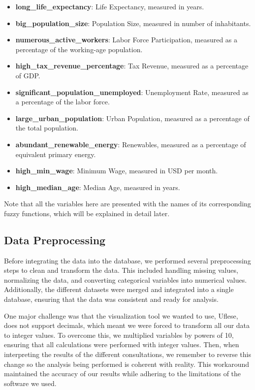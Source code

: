 \documentclass[fleqn,11pt]{article}
\begin{document}
\begin{itemize}
    \item \textbf{long\_life\_expectancy}: Life Expectancy, measured in years.
    \item \textbf{big\_population\_size}: Population Size, measured in number of inhabitants.
    \item \textbf{numerous\_active\_workers}: Labor Force Participation, measured as a percentage of the working-age population.
    \item \textbf{high\_tax\_revenue\_percentage}: Tax Revenue, measured as a percentage of GDP.
    \item \textbf{significant\_population\_unemployed}: Unemployment Rate, measured as a percentage of the labor force.
    \item \textbf{large\_urban\_population}: Urban Population, measured as a percentage of the total population.
    \item \textbf{abundant\_renewable\_energy}: Renewables, measured as a percentage of equivalent primary energy.
    \item \textbf{high\_min\_wage}: Minimum Wage, measured in USD per month.
    \item \textbf{high\_median\_age}: Median Age, measured in years.
\end{itemize}
Note that all the variables here are presented with the names of its corresponding fuzzy functions, which will be explained in detail later.

\subsection{Data Preprocessing}

Before integrating the data into the database, we performed several preprocessing steps to clean and transform the data.
This included handling missing values, normalizing the data, and converting categorical variables into numerical values.
Additionally, the different datasets were merged and integrated into a single database, ensuring that the data was consistent and ready for analysis.

One major challenge was that the visualization tool we wanted to use, Uflese, does not support decimals, which meant we were forced to transform all our data to integer values. To overcome this, we multiplied variables by powers of 10, ensuring that all calculations were performed with integer values. Then, when interpreting the results of the different consultations, we remember to reverse this change so the analysis being performed is coherent with reality. This workaround maintained the accuracy of our results while adhering to the limitations of the software we used.
\end{document}
